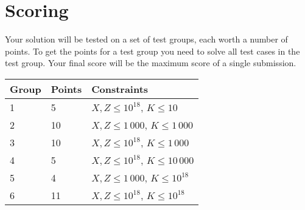 \section*{Scoring}
Your solution will be tested on a set of test groups, each worth a number of points.
To get the points for a test group you need to solve all test cases in the test group.
Your final score will be the maximum score of a single submission.

\noindent
\begin{tabular}{| l | l | l |}
\hline
Group & Points & Constraints \\ \hline
1     & 5      & $X, Z \le 10^{18}$, $K \le 10$ \\ \hline
2     & 10     & $X, Z \le 1\,000$, $K \le 1\,000$ \\ \hline
3     & 10     & $X, Z \le 10^{18}$, $K \le 1\,000$ \\ \hline
4     & 5      & $X, Z \le 10^{18}$, $K \le 10\,000$ \\ \hline
5     & 4      & $X, Z \le 1\,000$, $K \le 10^{18}$ \\ \hline
6     & 11     & $X, Z \le 10^{18}$, $K \le 10^{18}$ \\ \hline
\end{tabular}
